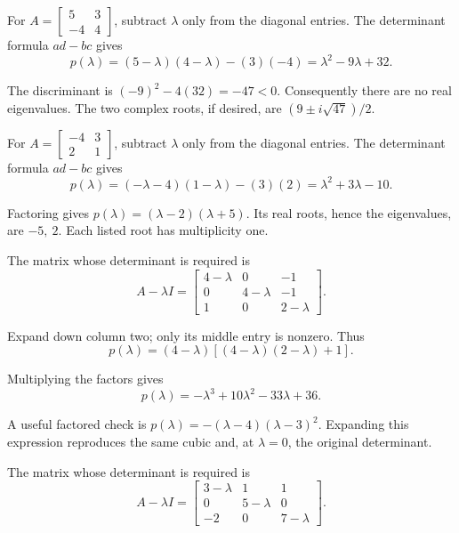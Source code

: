 For $A=\begin{bmatrix}5 & 3\\-4 & 4\end{bmatrix}$, subtract $\lambda$ only from the diagonal entries. The determinant formula $ad-bc$ gives
\[ p(\lambda)=(5 - \lambda)(4 - \lambda)-(3)(-4)=\lambda^{2} - 9 \lambda + 32.\]

The discriminant is $(-9)^2-4(32)=-47<0$. Consequently there are no real eigenvalues. The two complex roots, if desired, are $(9\pm i\sqrt{47})/2$.

For $A=\begin{bmatrix}-4 & 3\\2 & 1\end{bmatrix}$, subtract $\lambda$ only from the diagonal entries. The determinant formula $ad-bc$ gives
\[ p(\lambda)=(- \lambda - 4)(1 - \lambda)-(3)(2)=\lambda^{2} + 3 \lambda - 10.\]

Factoring gives $p(\lambda)=\left(\lambda - 2\right) \left(\lambda + 5\right)$. Its real roots, hence the eigenvalues, are $-5,\ 2$. Each listed root has multiplicity one.

The matrix whose determinant is required is
\[ A-\lambda I=\begin{bmatrix}4 - \lambda & 0 & -1\\0 & 4 - \lambda & -1\\1 & 0 & 2 - \lambda\end{bmatrix}.\]

Expand down column two; only its middle entry is nonzero. Thus
\[ p(\lambda)=(4-\lambda)[(4-\lambda)(2-\lambda)+1].\]

Multiplying the factors gives
\[ \boxed{p(\lambda)=- \lambda^{3} + 10 \lambda^{2} - 33 \lambda + 36}.\]

A useful factored check is $p(\lambda)=- \left(\lambda - 4\right) \left(\lambda - 3\right)^{2}$. Expanding this expression reproduces the same cubic and, at $\lambda=0$, the original determinant.

The matrix whose determinant is required is
\[ A-\lambda I=\begin{bmatrix}3 - \lambda & 1 & 1\\0 & 5 - \lambda & 0\\-2 & 0 & 7 - \lambda\end{bmatrix}.\]

